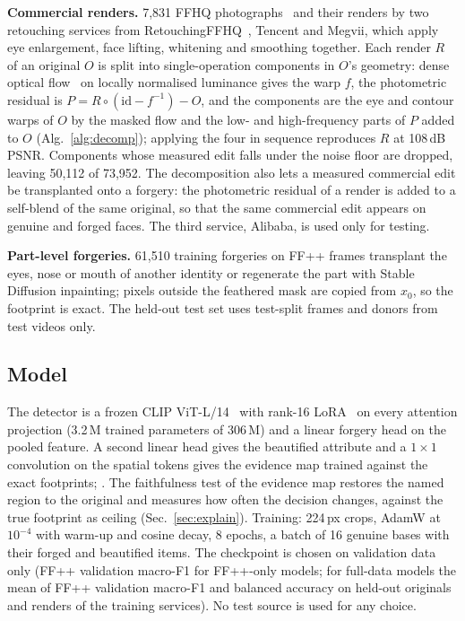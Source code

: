\textbf{Commercial renders.} 7,831 FFHQ photographs~\cite{ffhq} and their renders by two retouching services from
RetouchingFFHQ~\cite{retouchingffhq}, Tencent and Megvii, which apply eye enlargement, face lifting, whitening and
smoothing together. Each render $R$ of an original $O$ is split into single-operation components in $O$'s geometry: dense
optical flow~\cite{dis} on locally normalised luminance gives the warp $f$, the photometric residual is
$P=R\circ(\mathrm{id}-f^{-1})-O$, and the components are the eye and contour warps of $O$ by the masked flow and the
low- and high-frequency parts of $P$ added to $O$ (Alg.~\ref{alg:decomp}); applying the four in sequence reproduces $R$ at
108\,dB PSNR. Components whose measured edit falls under the noise floor are dropped, leaving 50,112 of 73,952. The
decomposition also lets a measured commercial edit be transplanted onto a forgery: the photometric residual of a render is
added to a self-blend of the same original, so that the same commercial edit appears on genuine and forged faces. The third
service, Alibaba, is used only for testing.

\textbf{Part-level forgeries.} 61,510 training forgeries on FF++ frames transplant the eyes, nose or mouth of another
identity or regenerate the part with Stable Diffusion inpainting; pixels outside the feathered mask are copied from $x_0$,
so the footprint is exact. The held-out test set uses test-split frames and donors from test videos only.

\subsection{Model}
\label{sec:model}
The detector is a frozen CLIP ViT-L/14~\cite{clip} with rank-16 LoRA~\cite{lora} on every attention projection (3.2\,M
trained parameters of 306\,M) and a linear forgery head on the pooled feature. A second linear head gives the beautified
attribute and a $1\times1$ convolution on the spatial tokens gives the evidence map trained against the exact footprints;
. The
faithfulness test of the evidence map restores the named region to the original and measures how often the decision
changes, against the true footprint as ceiling (Sec.~\ref{sec:explain}). Training: 224\,px crops, AdamW at $10^{-4}$ with
warm-up and cosine decay, 8 epochs, a batch of 16 genuine bases with their forged and beautified items. The checkpoint is
chosen on validation data only (FF++ validation macro-F1 for FF++-only models; for full-data models the mean of FF++
validation macro-F1 and balanced accuracy on held-out originals and renders of the training services). No test source is
used for any choice.
